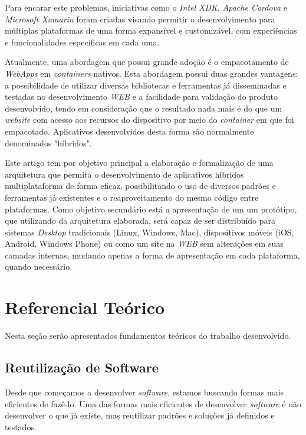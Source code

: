 Para encarar este problemas, iniciativas como o \textit{Intel XDK}, \textit{Apache Cordova} e \textit{Microsoft Xamarin} foram criadas visando permitir o desenvolvimento para múltiplas plataformas de uma forma expansível e customizável, com experiências e funcionalidades específicas em cada uma. 

Atualmente, uma abordagem que possui grande adoção é o empacotamento de \textit{WebApps} em \textit{containers} nativos. Esta abordagem possui duas grandes vantagens: a possibilidade de utilizar diversas bibliotecas e ferramentas já disseminadas e testadas no desenvolvimento \textit{WEB} e a facilidade para validação do produto desenvolvido, tendo em consideração que o resultado nada mais é do que um \textit{website} com acesso aos recursos do dispositivo por meio do \textit{container} em que foi empacotado. Aplicativos desenvolvidos desta forma são normalmente denominados "híbridos".

Este artigo tem por objetivo principal a elaboração e formalização de uma arquitetura que permita o desenvolvimento de aplicativos híbridos multiplataforma de forma eficaz, possibilitando o uso de diversos padrões e ferramentas já existentes e o reaproveitamento do mesmo código entre plataformas. Como objetivo secundário está a apresentação de um um protótipo, que utilizando da arquitetura elaborada, será capaz de ser distribuído para sistemas \textit{Desktop} tradicionais (Linux, Windows, Mac), dispositivos móveis (iOS, Android, Windows Phone) ou como um site na \textit{WEB} sem alterações em suas camadas internas, mudando apenas a forma de apresentação em cada plataforma, quando necessário.

\section{\esp Referencial Teórico}

Nesta seção serão apresentados fundamentos teóricos do trabalho desenvolvido.

\subsection{\esp Reutilização de Software}

Desde que começamos a desenvolver \textit{software}, estamos buscando formas mais eficientes de fazê-lo. Uma das formas mais eficientes de desenvolver \textit{software} é não desenvolver o que já existe, mas reutilizar padrões e soluções já definidos e testados. 

